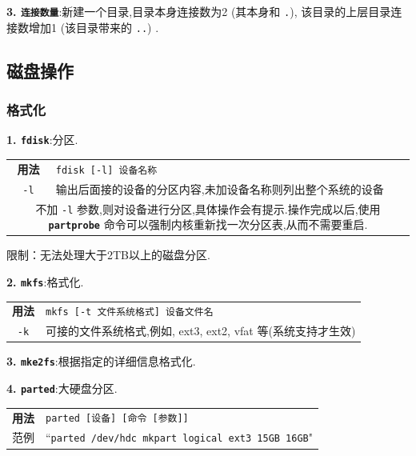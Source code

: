 \par
\textbf{3. \texttt{连接数量}}:新建一个目录,目录本身连接数为2 (其本身和 \verb"."), 该目录的上层目录连接数增加1 (该目录带来的 \verb"..") .

\subsection{磁盘操作}
\subsubsection{格式化}
\par
\textbf{1. \texttt{fdisk}}:分区.
{\kaishu
\begin{longtable}{c@{: }p{}}\hline\hline

    \textbf{用法} & \verb"fdisk [-l] 设备名称"
    \\

    \texttt{-l}  & 输出后面接的设备的分区内容,未加设备名称则列出整个系统的设备  \\

    \multicolumn{2}{p{\columnwidth}}{不加 \texttt{-l} 参数,则对设备进行分区,具体操作会有提示.操作完成以后,使用 \textbf{\texttt{partprobe}} 命令可以强制内核重新找一次分区表,从而不需要重启.} \\

    \hline
\end{longtable}}
限制：无法处理大于2TB以上的磁盘分区.

\textbf{2. \texttt{mkfs}}:格式化.
{\kaishu
\begin{longtable}{c@{: }p{}}\hline\hline

    \textbf{用法} & \verb"mkfs [-t 文件系统格式] 设备文件名"
    \\

    \texttt{-k}  & 可接的文件系统格式,例如, ext3, ext2, vfat 等(系统支持才生效)  \\

    \hline
\end{longtable}}

\textbf{3. \texttt{mke2fs}}:根据指定的详细信息格式化.

\textbf{4. \texttt{parted}}:大硬盘分区.
{\kaishu
\begin{longtable}{c@{: }p{}}\hline\hline

    \textbf{用法} & \verb"parted [设备] [命令 [参数]]"
    \\

    范例  & ``\texttt{parted /dev/hdc mkpart logical ext3 15GB 16GB}" \\

    \hline
\end{longtable}}



